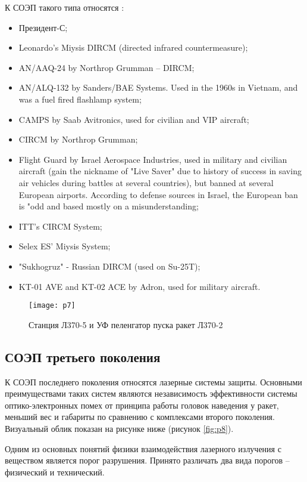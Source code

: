 К СОЭП такого типа относятся \cite[]{Infrared_countermeasure}:
\begin{itemize}
	\item Президент-С;
	\item Leonardo’s Miysis DIRCM (directed infrared countermeasure);
	\item AN/AAQ-24 by Northrop Grumman – DIRCM;
	\item AN/ALQ-132 by Sanders/BAE Systems. Used in the 1960s in Vietnam, and was a fuel fired flashlamp system;
	\item CAMPS by Saab Avitronics, used for civilian and VIP aircraft;
	\item CIRCM by Northrop Grumman;
	\item Flight Guard by Israel Aerospace Industries, used in military and civilian aircraft (gain the nickname of "Live Saver" due to history of success in saving air vehicles during battles at several countries), but banned at several European airports. According to defense sources in Israel, the European ban is "odd and based mostly on a misunderstanding;
	\item ITT's CIRCM System;
	\item Selex ES' Miysis System;
	\item "Sukhogruz" - Russian DIRCM (used on Su-25T);
	\item KT-01 AVE and KT-02 ACE by Adron, used for military aircraft.		
\end{itemize}

\begin{figure}[ht]
	\centering
	\texttt{[image: p7]} 
	\caption{Станция Л370-5 и УФ пеленгатор пуска ракет Л370-2}
	\label{fig:p7}
\end{figure}

\subsection{СОЭП третьего поколения}	
К СОЭП последнего поколения относятся лазерные системы защиты. Основными преимуществами таких систем являются независимость эффективности системы оптико-электронных помех от принципа работы головок наведения у ракет, меньший вес и габариты по сравнению с комплексами второго поколения. Визуальный облик показан на рисунке ниже (рисунок \ref{fig:p8}).

Одним из основных понятий физики взаимодействия лазерного излучения с веществом является порог разрушения. Принято различать два вида порогов – физический и технический. 

